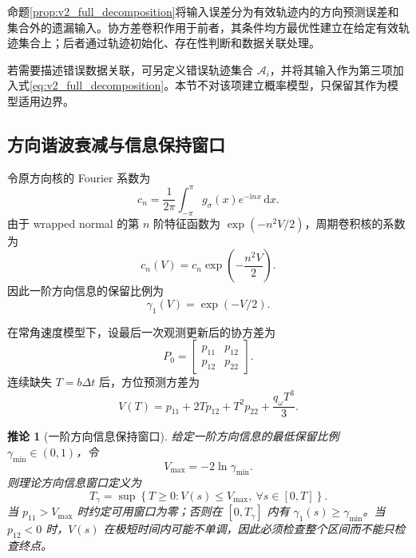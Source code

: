 \documentclass[UTF8,fontset=windows,11pt]{ctexart}
\newtheorem{corollary}[theorem]{推论}
\begin{document}
命题\ref{prop:v2_full_decomposition}将输入误差分为有效轨迹内的方向预测误差和集合外的遗漏输入。协方差卷积作用于前者，其条件均方最优性建立在给定有效轨迹集合上；后者通过轨迹初始化、存在性判断和数据关联处理。

若需要描述错误数据关联，可另定义错误轨迹集合 $\mathcal A_i$，并将其输入作为第三项加入式\eqref{eq:v2_full_decomposition}。本节不对该项建立概率模型，只保留其作为模型适用边界。

\subsection{方向谐波衰减与信息保持窗口}

令原方向核的 Fourier 系数为
\begin{equation}
 c_n=\frac{1}{2\pi}\int_{-\pi}^{\pi}g_\sigma(x)e^{-\mathrm inx}\,\mathrm dx .
 \label{eq:v2_fourier_coeff}
\end{equation}
由于 wrapped normal 的第 $n$ 阶特征函数为 $\exp(-n^2V/2)$，周期卷积核的系数为
\begin{equation}
 c_n(V)=c_n\exp\left(-\frac{n^2V}{2}\right).
 \label{eq:v2_harmonic_decay}
\end{equation}
因此一阶方向信息的保留比例为
\begin{equation}
 \gamma_1(V)=\exp(-V/2).
 \label{eq:v2_first_harmonic}
\end{equation}

在常角速度模型下，设最后一次观测更新后的协方差为
\begin{equation}
 P_0=\begin{bmatrix}p_{11}&p_{12}\\p_{12}&p_{22}\end{bmatrix}.
 \label{eq:v2_p0}
\end{equation}
连续缺失 $T=b\Delta t$ 后，方位预测方差为
\begin{equation}
 V(T)=p_{11}+2Tp_{12}+T^2p_{22}+\frac{q_\omega T^3}{3}.
 \label{eq:v2_vt}
\end{equation}

\begin{corollary}[一阶方向信息保持窗口]
\label{cor:v2_direction_window}
给定一阶方向信息的最低保留比例 $\gamma_{\min}\in(0,1)$，令
\begin{equation}
 V_{\max}=-2\ln\gamma_{\min}.
 \label{eq:v2_vmax}
\end{equation}
则理论方向信息窗口定义为
\begin{equation}
 T_\gamma=\sup\left\{T\ge0:
 V(s)\le V_{\max},\ \forall s\in[0,T]\right\}.
 \label{eq:v2_tgamma}
\end{equation}
当 $p_{11}>V_{\max}$ 时约定可用窗口为零；否则在 $[0,T_\gamma]$ 内有 $\gamma_1(s)\ge\gamma_{\min}$。当 $p_{12}<0$ 时，$V(s)$ 在极短时间内可能不单调，因此必须检查整个区间而不能只检查终点。
\end{corollary}
\end{document}
